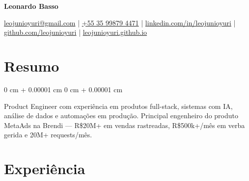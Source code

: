 \documentclass[10pt, a4paper]{article}
\newenvironment{onecolentry}{
    \begin{adjustwidth}{
        0 cm + 0.00001 cm
    }{
        0 cm + 0.00001 cm
    }
}{
    \end{adjustwidth}
}
\begin{document}
    \begin{center}
        {\fontsize{25pt}{25pt}\selectfont \textbf{Leonardo Basso}}

        \vspace{5pt}

        \normalsize
        \href{mailto:leojunioyuri@gmail.com}{leojunioyuri@gmail.com}
        \quad|\quad
        \href{tel:+5535998794471}{+55 35 99879 4471}
        \quad|\quad
        \href{https://linkedin.com/in/leojunioyuri}{linkedin.com/in/leojunioyuri}
        \quad|\quad
        \href{https://github.com/leojunioyuri}{github.com/leojunioyuri}
        \quad|\quad
        \href{https://leojunioyuri.github.io}{leojunioyuri.github.io}
    \end{center}

    \vspace{3pt}

    \section{Resumo}
    \vspace{0.1 cm}
    \begin{onecolentry}
        Product Engineer com experiência em produtos full-stack, sistemas com IA, análise de dados e automações em produção.
        Principal engenheiro do produto MetaAds na Brendi --- R\$20M+ em vendas rastreadas, R\$500k+/mês em verba gerida e 20M+ requests/mês.
    \end{onecolentry}

    \vspace{0.18 cm}

    \section{Experiência}
\end{document}
